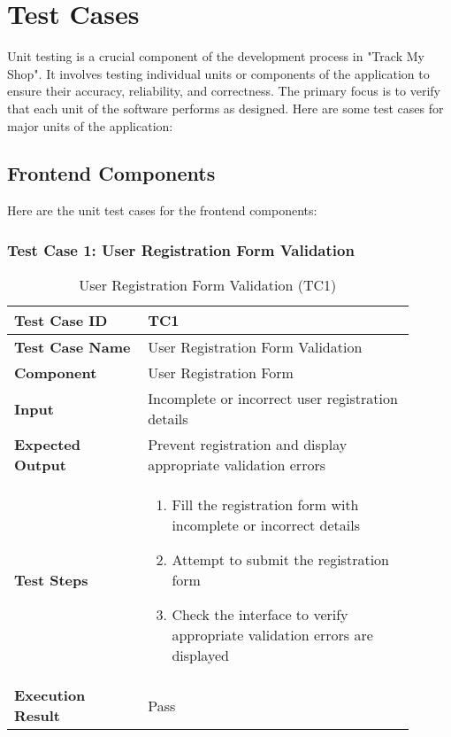 \section{Test Cases}
Unit testing is a crucial component of the development process in "Track My Shop". It involves testing individual units or components of the application to ensure their accuracy, reliability, and correctness. The primary focus is to verify that each unit of the software performs as designed. Here are some test cases for major units of the application:


\subsection{Frontend Components}

Here are the unit test cases for the frontend components:


\begin{table}[h]
	\subsubsection{Test Case 1: User Registration Form Validation}
	\centering
	\caption{User Registration Form Validation (TC1)}
	\begin{tabular}{|p{0.3\linewidth}|p{0.6\linewidth}|}
		\hline
		\textbf{Test Case ID} & TC1 \\
		\hline
		\textbf{Test Case Name} & User Registration Form Validation \\
		\hline
		\textbf{Component} & User Registration Form \\
		\hline
		\textbf{Input} & Incomplete or incorrect user registration details \\
		\hline
		\textbf{Expected Output} & Prevent registration and display appropriate validation errors \\
		\hline
		\textbf{Test Steps} & 
		\begin{enumerate}
			\item Fill the registration form with incomplete or incorrect details
			\item Attempt to submit the registration form
			\item Check the interface to verify appropriate validation errors are displayed
		\end{enumerate} \\
		\hline
		\textbf{Execution Result} & Pass \\
		\hline
	\end{tabular}
\end{table}

